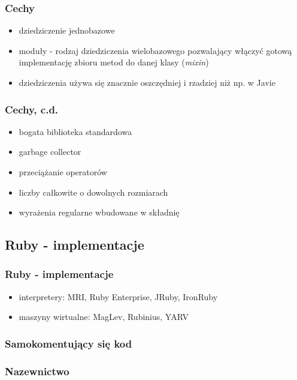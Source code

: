 \documentclass[12t]{beamer}
\begin{document}
\begin{frame}
  \frametitle{Cechy}
  \begin{itemize}
  \item dziedziczenie jednobazowe
  \item moduły - rodzaj dziedziczenia wielobazowego pozwalający
    włączyć gotową implementację zbioru metod do danej klasy
    (\emph{mixin})
  \item dziedziczenia używa się znacznie oszczędniej i rzadziej niż
    np. w Javie
  \end{itemize}
\end{frame}

\begin{frame}
  \frametitle{Cechy, c.d.}
  \begin{itemize}
  \item bogata biblioteka standardowa
  \item garbage collector
  \item przeciążanie operatorów
  \item liczby całkowite o dowolnych rozmiarach
  \item wyrażenia regularne wbudowane w składnię
  \end{itemize}
\end{frame}

\subsection{Ruby - implementacje}
\begin{frame}
  \frametitle{Ruby - implementacje}
  \begin{itemize}
  \item interpretery: MRI, Ruby Enterprise, JRuby, IronRuby
  \item maszyny wirtualne: MagLev, Rubinius, YARV
  \end{itemize}
\end{frame}

\begin{frame}[fragile]
  \frametitle{Samokomentujący się kod}
  
\end{frame}

\begin{frame}[fragile]
  \frametitle{Nazewnictwo}
  \begin{small}
    
  \end{small}
\end{frame}
\end{document}

